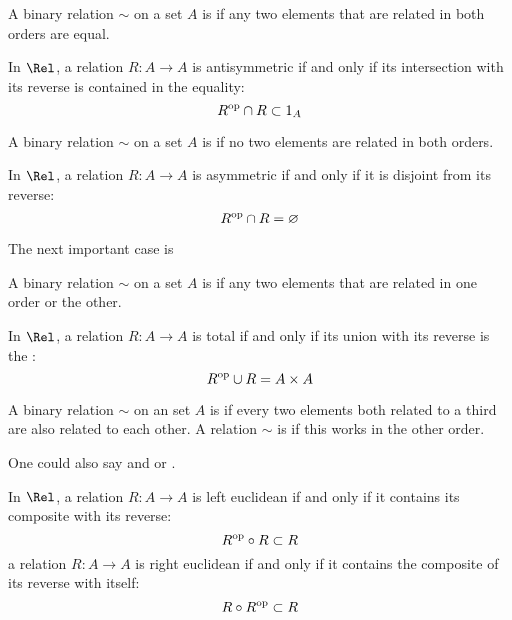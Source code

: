   \begin{defn}
    A binary relation $\sim$ on a set $A$ is  if any two elements that are related in both orders are equal.
  \end{defn}
  In $\Rel$, a relation $R\colon A\to A$ is antisymmetric if and only if its intersection with its reverse is contained in the equality:
  \begin{equation*}
    R^{\operatorname{op}}\cap R\subset 1_A
  \end{equation*}

  \begin{defn}
    A binary relation $\sim$ on a set $A$ is  if no two elements are related in both orders.
  \end{defn}
  In $\Rel$, a relation $R\colon A\to A$ is asymmetric if and only if it is disjoint from its reverse:
  \begin{equation*}
    R^{\operatorname{op}}\cap R = \varnothing
  \end{equation*}

  The next important case is
  \begin{defn}
    A binary relation $\sim$ on a set $A$ is  if any two elements that are related in one order or the other.
  \end{defn}
  In $\Rel$, a relation $R\colon A\to A$ is total if and only if its union with its reverse is the :
  \begin{equation*}
    R^{\operatorname{op}}\cup R = A\times A
  \end{equation*}

  \begin{defn}
    A binary relation $\sim$ on an set $A$ is  if every two elements both related to a third are also related to each other. A relation $\sim$ is  if this works in the other order.
  \end{defn}
  \begin{rem}
    One could also say  and  or .
  \end{rem}
  In $\Rel$, a relation $R\colon A\to A$ is left euclidean if and only if it contains its composite with its reverse:
  \begin{equation*}
    R^{\operatorname{op}}\circ R \subset R
  \end{equation*}
  a relation $R\colon A\to A$ is right euclidean if and only if it contains the composite of its reverse with itself:
  \begin{equation*}
    R\circ R^{\operatorname{op}} \subset R
  \end{equation*}

